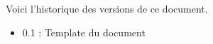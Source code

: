 Voici l’historique des versions de ce document.

\begin{itemize}
	\item 0.1 : Template du document
\end{itemize}